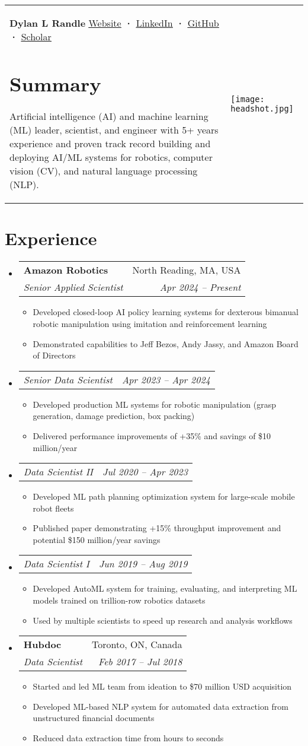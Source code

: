 \documentclass[a4paper,11pt]{article}
\makeatletter
\newcommand{\resumeItem}[1]{
  \item\small{#1}
}
\newcommand{\resumeItemListStart}{\begin{itemize}[rightmargin=0.11in]}
\newcommand{\resumeItemListEnd}{\end{itemize}}
\newcommand{\resumeQuadHeading}[4]{
  \item
  \begin{tabular*}{0.96\textwidth}[t]{l@{\extracolsep{\fill}}r}
    \textbf{#1} & #2 \\
    \textit{\small#3} & \textit{\small #4} \\
  \end{tabular*}
}
\newcommand{\resumeQuadHeadingChild}[2]{
  \item
  \begin{tabular*}{0.96\textwidth}[t]{l@{\extracolsep{\fill}}r}
    \textit{\small#1} & \textit{\small#2} \\
  \end{tabular*}
}
\newcommand{\resumeHeadingListStart}{
  \begin{itemize}[leftmargin=0.15in, label={}]
}
\newcommand{\resumeHeadingListEnd}{\end{itemize}}
\makeatother
\begin{document}
\begin{tabularx}{\linewidth}{@{}m{} m{}@{}}
{
    \textbf{\Huge Dylan L Randle \vspace{2pt}} \newline
    \href{https://dylanrandle.github.io/}{\uline{Website}} \textbf{·}
    \href{https://linkedin.com/in/dylanrandle}{\uline{LinkedIn}} \textbf{·}
    \href{https://github.com/dylanrandle}{\uline{GitHub}} \textbf{·}
    \href{https://scholar.google.com/citations?user=62z1l9cAAAAJ}{\uline{Scholar}}
    \section{Summary}
    \small{
      Artificial intelligence (AI) and machine learning (ML) leader, scientist, and engineer with 5+ years experience and proven track record building and deploying AI/ML systems for robotics, computer vision (CV), and natural language processing (NLP).
    }
} & 
{
    \hfill
    \texttt{[image: headshot.jpg]}
}
\end{tabularx}


\section{Experience}
\resumeHeadingListStart{}
  \resumeQuadHeading{Amazon Robotics}{North Reading, MA, USA}{Senior Applied Scientist}{Apr 2024 -- Present}
    \resumeItemListStart
      \resumeItem{Developed closed-loop AI policy learning systems for dexterous bimanual robotic manipulation using imitation and reinforcement learning}
      \resumeItem{Demonstrated capabilities to Jeff Bezos, Andy Jassy, and Amazon Board of Directors}
    \resumeItemListEnd
  \resumeQuadHeadingChild{Senior Data Scientist}{Apr 2023 -- Apr 2024}
    \resumeItemListStart
      \resumeItem{Developed production ML systems for robotic manipulation (grasp generation, damage prediction, box packing)}
      \resumeItem{Delivered performance improvements of +35\% and savings of \$10 million/year}
    \resumeItemListEnd
  \resumeQuadHeadingChild{Data Scientist II}{Jul 2020 -- Apr 2023}
    \resumeItemListStart
      \resumeItem{Developed ML path planning optimization system for large-scale mobile robot fleets}
      \resumeItem{Published paper demonstrating +15\% throughput improvement and potential \$150 million/year savings}
    \resumeItemListEnd
  \resumeQuadHeadingChild{Data Scientist I}{Jun 2019 -- Aug 2019}
    \resumeItemListStart
      \resumeItem{Developed AutoML system for training, evaluating, and interpreting ML models trained on trillion-row robotics datasets}
      \resumeItem{Used by multiple scientists to speed up research and analysis workflows}
    \resumeItemListEnd
  \resumeQuadHeading{Hubdoc}{Toronto, ON, Canada}
  {Data Scientist}{Feb 2017 -- Jul 2018}
    \resumeItemListStart{}
        \resumeItem{Started and led ML team from ideation to \$70 million USD acquisition}
        \resumeItem{Developed ML-based NLP system for automated data extraction from unstructured financial documents}
        \resumeItem{Reduced data extraction time from hours to seconds}
    \resumeItemListEnd{}
\resumeHeadingListEnd{}
\end{document}
